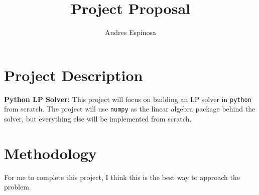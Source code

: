 \documentclass[11pt]{article}
\title{Project Proposal}
\author{Andres Espinosa}
\begin{document}
\maketitle

\section{Project Description}
\textbf{Python LP Solver:}
This project will focus on building an LP solver in \texttt{python} from scratch. 
The project will use \texttt{numpy} as the linear algebra package behind the solver, but everything else will be implemented from scratch.

\section{Methodology}
For me to complete this project, I think this is the best way to approach the problem.
\end{document}
